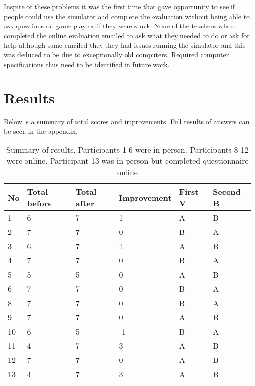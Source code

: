 Inspite of these problems it was the first time that gave opportunity to see if people could use the simulator and complete the evaluation without being able to ask questions on game play or if they were stuck. None of the teachers whom completed the online evaluation emailed to ask what they needed to do or ask for help although some emailed they they had issues running the simulator and this was deduced to be due to exceptionally old computers. Required computer specifications thus need to be identified in future work.  

\section{Results}


Below is a summary of total scores and improvements. Full results of answers can be seen in the appendix. 

\begin{table}[H]
    \begin{tabular}{| p{1cm} | p{2cm} | p{2cm} | p{3cm} | p{3cm} | p{3cm} |}
    \hline
    \textbf{No} & \textbf{Total before} & \textbf{Total after} & \textbf{Improvement} & \textbf{First V} & \textbf{Second B} \\                                                                                                                                                                                    
	\hline
	1 & 6 & 7 & 1 & A & B \\ \hline
	2 & 7 & 7 & 0 & B & A \\ \hline
	3 & 6 & 7 & 1 & A & B \\ \hline
	4 & 7 & 7 & 0 & B & A \\ \hline
	5 & 5 & 5 & 0 & A & B \\ \hline
	6 & 7 & 7 & 0 & B & A \\ \hline
	
	8 & 7 & 7 & 0 & B & A\\ \hline
	9 & 7 & 7 & 0 & A & B \\ \hline
	10 & 6 & 5 & -1 & B & A \\ \hline
	11 & 4 & 7 & 3 & A & B \\ \hline
	12 & 7 & 7 & 0 & A & B \\ \hline
	13 & 4 & 7 & 3 & A & B \\ \hline
    \hline
    \end{tabular}
    \caption{Summary of results. Participants 1-6 were in person. Participants 8-12 were online. Participant 13 was in person but completed questionnaire online}
\end{table}

